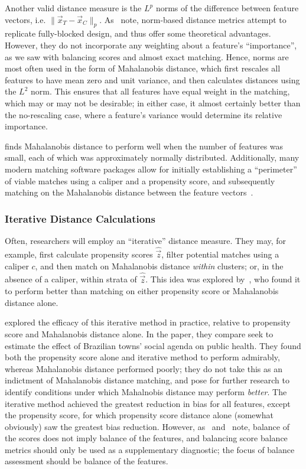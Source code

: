 \documentclass[11pt]{extarticle}
\begin{document}
Another valid distance measure is the $L^p$ norms of the difference between feature vectors, i.e. $\| \vec{x}_T - \vec{x}_C \|_p$. 
As~\textcite{king_why_2019} note, norm-based distance metrics attempt to replicate fully-blocked design, and thus offer some theoretical advantages.
However, they do not incorporate any weighting about a feature's ``importance'', as we saw with balancing scores and almost exact matching.
Hence, norms are most often used in the form of Mahalanobis distance, which first rescales all features to have mean zero and unit variance, and then calculates distances using the $L^2$ norm.
This ensures that all features have equal weight in the matching, which may or may not be desirable; in either case, it almost certainly better than the no-rescaling case, where a feature's variance would determine its relative importance.

\textcite{leacy_joint_2014} finds Mahalanobis distance to perform well when the number of features was small, each of which was approximately normally distributed. Additionally, many modern matching software packages allow for initially establishing a ``perimeter'' of viable matches using a caliper and a propensity score, and subsequently matching on the Mahalanobis distance between the feature vectors~\parencite{ho_matchit_2011}.

\subsubsection{Iterative Distance Calculations}

Often, researchers will employ an ``iterative'' distance measure. They may, for example, first calculate propensity scores $\widehat{\vec{z}}$, filter potential matches using a caliper $c$, and then match on Mahalanobis distance \emph{within} clusters; or, in the absence of a caliper, within strata of $\widehat{\vec{z}}$. This idea was explored by~\textcite{rosenbaum_constructing_1985}, who found it to perform better than matching on either propensity score or Mahalanobis distance alone.

\textcite{baltar_mahalanobis_2014} explored the efficacy of this iterative method in practice, relative to propensity score and Mahalanobis distance alone. In the paper, they compare seek to estimate the effect of Brazilian towns' social agenda on public health. They found both the propensity score alone and iterative method to perform admirably, whereas Mahalanobis distance performed poorly; they do not take this as an indictment of Mahalanobis distance matching, and pose for further research to identify conditions under which Mahalnobis distance may perform \emph{better}. The iterative method achieved the greatest reduction in bias for all features, except the propensity score, for which propensity score distance alone (somewhat obviously) saw the greatest bias reduction. However, as~\textcite{austin_optimal_2011} and~\textcite{greifer_assessing_2022} note, balance of the scores does not imply balance of the features, and balancing score balance metrics should only be used as a supplementary diagnostic; the focus of balance assessment should be balance of the features.
\end{document}
